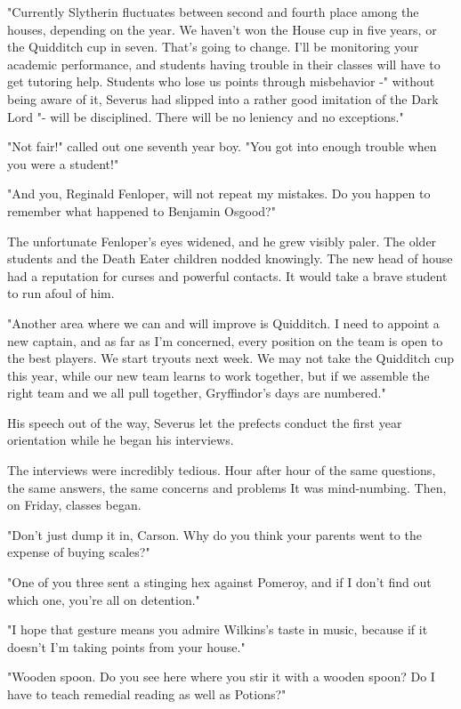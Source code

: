 "Currently Slytherin fluctuates between second and fourth place among the houses, depending on the year. We haven't won the House cup in five years, or the Quidditch cup in seven. That's going to change. I'll be monitoring your academic performance, and students having trouble in their classes will have to get tutoring help. Students who lose us points through misbehavior -" without being aware of it, Severus had slipped into a rather good imitation of the Dark Lord "- will be{\el} disciplined. There will be no leniency and no exceptions."

"Not fair!" called out one seventh year boy. "You got into enough trouble when you were a student!"

"And you, Reginald Fenloper, will not repeat my mistakes. Do you happen to remember what happened to Benjamin Osgood?"

The unfortunate Fenloper's eyes widened, and he grew visibly paler. The older students and the Death Eater children nodded knowingly. The new head of house had a reputation for curses and powerful contacts. It would take a brave student to run afoul of him.

"Another area where we can and will improve is Quidditch. I need to appoint a new captain, and as far as I'm concerned, every position on the team is open to the best players. We start tryouts next week. We may not take the Quidditch cup this year, while our new team learns to work together, but if we assemble the right team and we all pull together, Gryffindor's days are numbered."

His speech out of the way, Severus let the prefects conduct the first year orientation while he began his interviews.

The interviews were incredibly tedious. Hour after hour of the same questions, the same answers, the same concerns and problems{\el} It was mind-numbing. Then, on Friday, classes began.

"Don't just dump it in, Carson. Why do you think your parents went to the expense of buying scales?"

"One of you three sent a stinging hex against Pomeroy, and if I don't find out which one, you're all on detention."

"I hope that gesture means you admire Wilkins's taste in music, because if it doesn't I'm taking points from your house."

"Wooden spoon. Do you see here where you stir it with a wooden spoon? Do I have to teach remedial reading as well as Potions?"

